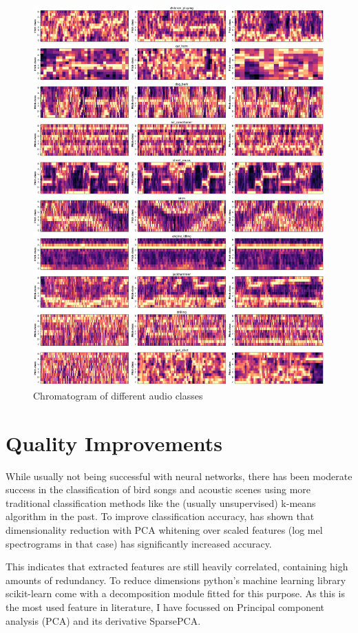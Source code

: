 \begin{figure}[H]
    \centering
	\includegraphics[width=.7\textwidth]{./images/features/chroma}
    \caption{Chromatogram of different audio classes}
    \label{fig:chroma}
\end{figure}



\section{Quality Improvements}
\label{chap:quality}
While usually not being successful with neural networks, there has been moderate success in the classification of bird songs and acoustic scenes using more traditional classification methods like the (usually unsupervised) k-means algorithm in the past. To improve classification accuracy, \cite{Coates2012} has shown that dimensionality reduction with PCA whitening over scaled features (log mel spectrograms in that case) has significantly increased accuracy. 

This indicates that extracted features are still heavily correlated, containing high amounts of redundancy. To reduce dimensions python's machine learning library scikit-learn come with a decomposition module fitted for this purpose. As this is the most used feature in literature, I have focussed on Principal component analysis (PCA) and its derivative SparsePCA.


